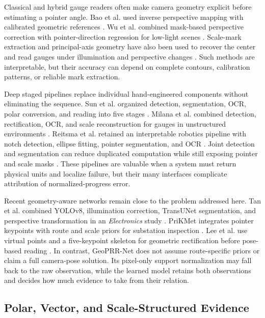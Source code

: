\documentclass[electronics,article,submit,oneauthor]{Definitions/mdpi}
\newcommand{\modelname}{GeoPRR-Net\xspace}
\begin{document}
Classical and hybrid gauge readers often make camera geometry explicit before estimating a pointer angle. Bao et al. used inverse perspective mapping with calibrated geometric references \cite{bao2019ipm}. Wu et al. combined mask-based perspective correction with pointer-direction regression for low-light scenes \cite{wu2021lowlight}. Scale-mark extraction and principal-axis geometry have also been used to recover the center and read gauges under illumination and perspective changes \cite{wang2022scalemark}. Such methods are interpretable, but their accuracy can depend on complete contours, calibration patterns, or reliable mark extraction.

Deep staged pipelines replace individual hand-engineered components without eliminating the sequence. Sun et al. organized detection, segmentation, OCR, polar conversion, and reading into five stages \cite{sun2023pointer}. Milana et al. combined detection, rectification, OCR, and scale reconstruction for gauges in unstructured environments \cite{milana2022gauges}. Reitsma et al. retained an interpretable robotics pipeline with notch detection, ellipse fitting, pointer segmentation, and OCR \cite{reitsma2024underpressure}. Joint detection and segmentation can reduce duplicated computation while still exposing pointer and scale masks \cite{li2024joint}. These pipelines are valuable when a system must return physical units and localize failure, but their many interfaces complicate attribution of normalized-progress error.

Recent geometry-aware networks remain close to the problem addressed here. Tan et al. combined YOLOv8, illumination correction, TransUNet segmentation, and perspective transformation in an \emph{Electronics} study \cite{tan2024transunet}. PriKMet integrates pointer keypoints with route and scale priors for substation inspection \cite{chu2025prikmet}. Lee et al. use virtual points and a five-keypoint skeleton for geometric rectification before pose-based reading \cite{lee2026p2yolo}. In contrast, \modelname does not assume route-specific priors or claim a full camera-pose solution. Its pixel-only support normalization may fall back to the raw observation, while the learned model retains both observations and decides how much evidence to take from their relation.

\subsection{Polar, Vector, and Scale-Structured Evidence}
\end{document}
